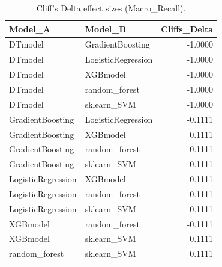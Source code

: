 \begin{table}[t]
\centering
\begin{tabular}{llr}
\toprule
Model_A & Model_B & Cliffs_Delta \\
\midrule
DTmodel & GradientBoosting & -1.0000 \\
DTmodel & LogisticRegression & -1.0000 \\
DTmodel & XGBmodel & -1.0000 \\
DTmodel & random_forest & -1.0000 \\
DTmodel & sklearn_SVM & -1.0000 \\
GradientBoosting & LogisticRegression & -0.1111 \\
GradientBoosting & XGBmodel & 0.1111 \\
GradientBoosting & random_forest & 0.1111 \\
GradientBoosting & sklearn_SVM & 0.1111 \\
LogisticRegression & XGBmodel & 0.1111 \\
LogisticRegression & random_forest & 0.1111 \\
LogisticRegression & sklearn_SVM & 0.1111 \\
XGBmodel & random_forest & -0.1111 \\
XGBmodel & sklearn_SVM & 0.1111 \\
random_forest & sklearn_SVM & 0.1111 \\
\bottomrule
\end{tabular}
\caption{Cliff's Delta effect sizes (Macro_Recall).}
\label{tab:cliffs_Macro_Recall}
\end{table}